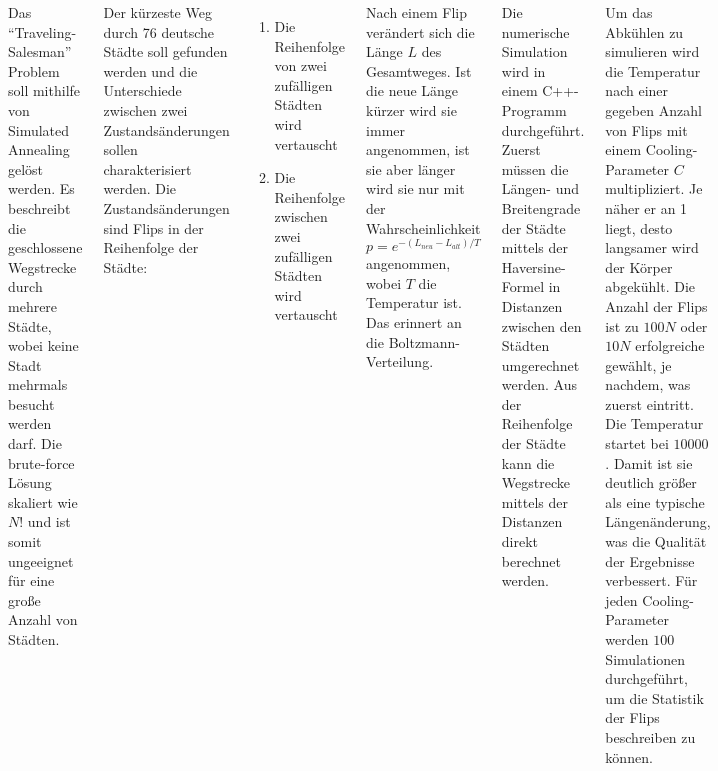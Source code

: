 \documentclass[35pt, a0paper, portrait]{tikzposter}
\begin{document}
\begin{columns}
  {
    Das ``Traveling-Salesman'' Problem soll mithilfe von Simulated Annealing gelöst werden. Es beschreibt die geschlossene Wegstrecke durch mehrere Städte, wobei keine Stadt mehrmals besucht werden darf. Die brute-force Lösung skaliert wie $N!$ und ist somit ungeeignet für eine große Anzahl von Städten.

    Der kürzeste Weg durch 76 deutsche Städte soll gefunden werden und die Unterschiede zwischen zwei Zustandsänderungen sollen charakterisiert werden. Die Zustandsänderungen sind Flips in der Reihenfolge der Städte:

    \begin{enumerate}
      \item Die Reihenfolge von zwei zufälligen Städten wird vertauscht
      \item Die Reihenfolge zwischen zwei zufälligen Städten wird vertauscht
    \end{enumerate}

    Nach einem Flip verändert sich die Länge $L$ des Gesamtweges. Ist die neue Länge kürzer wird sie immer angenommen, ist sie aber länger wird sie nur mit der Wahrscheinlichkeit
    \begin{equation}
      p = e^{- (L_{neu} - L_{alt})/T}
    \end{equation}
    angenommen, wobei $T$ die Temperatur ist. Das erinnert an die Boltzmann-Verteilung.
  }

  {
    Die numerische Simulation wird in einem C++-Programm durchgeführt. Zuerst müssen die Längen- und Breitengrade der Städte mittels der Haversine-Formel in Distanzen zwischen den Städten umgerechnet werden. Aus der Reihenfolge der Städte kann die Wegstrecke mittels der Distanzen direkt berechnet werden.

    Um das Abkühlen zu simulieren wird die Temperatur nach einer gegeben Anzahl von Flips mit einem Cooling-Parameter $C$ multipliziert. Je näher er an 1 liegt, desto langsamer wird der Körper abgekühlt.  Die Anzahl der Flips ist zu $100N$ oder $10N$ erfolgreiche gewählt, je nachdem, was zuerst eintritt. Die Temperatur startet bei $10000$. Damit ist sie deutlich größer als eine typische Längenänderung, was die Qualität der Ergebnisse verbessert. Für jeden Cooling-Parameter werden $100$ Simulationen durchgeführt, um die Statistik der Flips beschreiben zu können.
    }
\end{columns}
\end{document}
